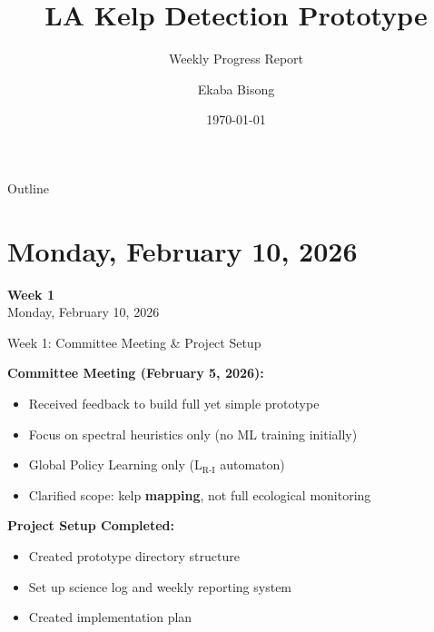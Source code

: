 \documentclass[10pt,xcolor={table,dvipsnames},t]{beamer}
\title[LA Kelp Prototype Progress]{LA Kelp Detection Prototype}
\subtitle{Weekly Progress Report}
\author{Ekaba Bisong}
\institute{Department of Computer Science\\University of Victoria}
\date{\today}
\begin{document}
\begin{frame}
  \titlepage
\end{frame}

\begin{frame}{Outline}
  \tableofcontents
\end{frame}

\section{Monday, February 10, 2026}

\begin{frame}
\centering
\vfill
{\Large\textbf{Week 1}}\\[1em]
{\large Monday, February 10, 2026}
\vfill
\end{frame}

\begin{frame}{Week 1: Committee Meeting \& Project Setup}

\textbf{Committee Meeting (February 5, 2026):}
\begin{itemize}
  \item Received feedback to build full yet simple prototype
  \item Focus on spectral heuristics only (no ML training initially)
  \item Global Policy Learning only (L$_{\text{R-I}}$ automaton)
  \item Clarified scope: kelp \textbf{mapping}, not full ecological monitoring
\end{itemize}

\vspace{0.5em}
\textbf{Project Setup Completed:}
\begin{itemize}
  \item Created prototype directory structure
  \item Set up science log and weekly reporting system
  \item Created implementation plan
\end{itemize}

\end{frame}
\end{document}
